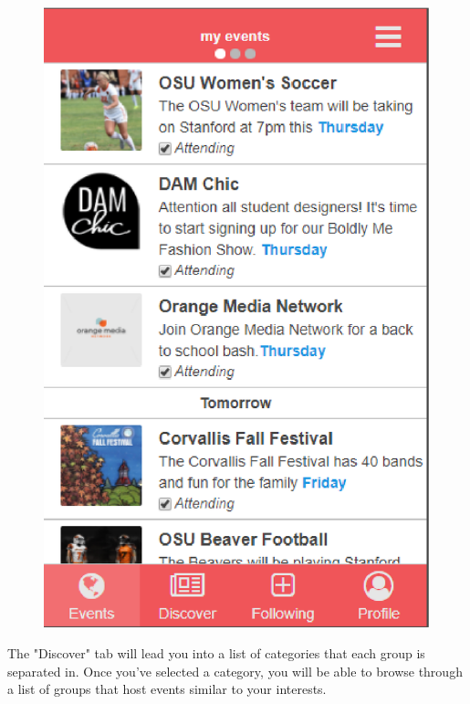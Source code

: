 \documentclass[letterpaper, 10pt,titlepage]{article}
\begin{document}
  \begin{figure}[H]
	\centering
    \includegraphics[scale=0.55]{events.eps}
  \end{figure}

The "Discover" tab will lead you into a list of categories that each group is separated in. Once you've selected a category, you will be able to browse through a list of groups that host events similar to your interests. 
\end{document}
